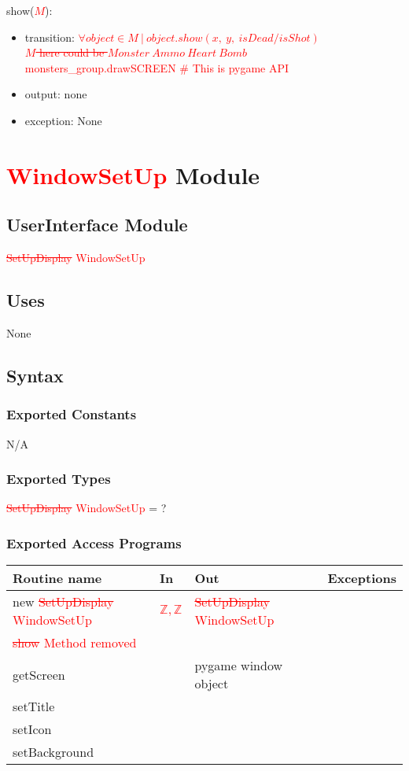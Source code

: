 \documentclass[12pt]{article}
\begin{document}
\noindent show(\textcolor{red}{\st{$M$}}):
\begin{itemize}
    \item transition: \textcolor{red}{\st{$\forall object \in M\ |\ object.show(x,\ y,\ isDead/isShot)$\\
    $M$ here could be $Monster\ Ammo\ Heart\ Bomb$}}\\
    \textcolor{red}{monsters\_group.draw{SCREEN} \# This is pygame API}
    \item output: none
    \item exception: None
\end{itemize}
\newpage

\section{\textcolor{red}{ WindowSetUp} Module}

\subsection*{UserInterface Module}
\textcolor{red}{\st{SetUpDisplay} WindowSetUp }
\subsection*{Uses}
None

\subsection*{Syntax}
\subsubsection*{Exported Constants}
N/A
\subsubsection*{Exported Types}
\textcolor{red}{\st{SetUpDisplay} WindowSetUp } = ?

\subsubsection*{Exported Access Programs}
\begin{tabular}{| l | l | l | l |}
\hline
\textbf{Routine name} & \textbf{In} & \textbf{Out} & \textbf{Exceptions}\\
\hline
new \textcolor{red}{\st{SetUpDisplay} WindowSetUp }       &      \textcolor{red}{$\mathbb{Z}, \mathbb{Z}$}     &     \textcolor{red}{\st{SetUpDisplay} WindowSetUp }       &           \\
\hline
\textcolor{red}{\st{show  } Method removed}     &	   &           &          \\
\hline
getScreen      &	   &pygame window  object&          \\
\hline
setTitle &&&\\
\hline
setIcon &&&\\
\hline
setBackground &&&\\
\hline
\end{tabular}
\end{document}
